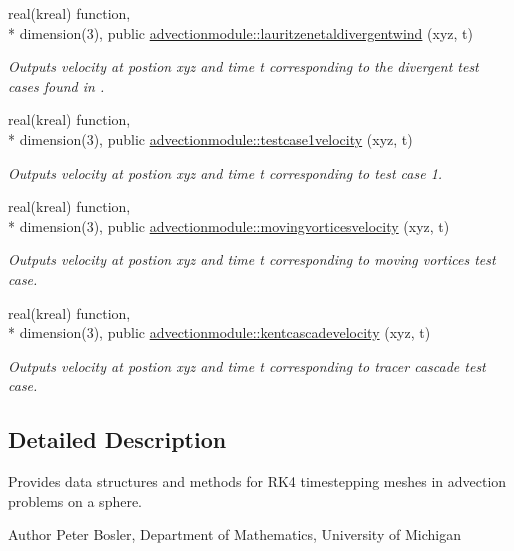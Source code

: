 \begin{DoxyCompactItemize}
real(kreal) function, \\*
dimension(3), public \hyperlink{group__AdvectionRK4_ga8f7661486a24b73e0ccff377adfb29db}{advectionmodule\+::lauritzenetaldivergentwind} (xyz, t)
\begin{DoxyCompactList}\small\item\em Outputs velocity at postion xyz and time t corresponding to the divergent test cases found in \cite{LauritzenEtAl2012}. \end{DoxyCompactList}\item 
real(kreal) function, \\*
dimension(3), public \hyperlink{group__AdvectionRK4_gad30efb36915276cdc54a055b474d93d8}{advectionmodule\+::testcase1velocity} (xyz, t)
\begin{DoxyCompactList}\small\item\em Outputs velocity at postion xyz and time t corresponding to \cite{WilliamsonEtAl1992} test case 1. \end{DoxyCompactList}\item 
real(kreal) function, \\*
dimension(3), public \hyperlink{group__AdvectionRK4_gaad6c3850042d085e15518e2cb9d8909f}{advectionmodule\+::movingvorticesvelocity} (xyz, t)
\begin{DoxyCompactList}\small\item\em Outputs velocity at postion xyz and time t corresponding to \cite{NairJablonowski2008} moving vortices test case. \end{DoxyCompactList}\item 
real(kreal) function, \\*
dimension(3), public \hyperlink{group__AdvectionRK4_ga0001703c78ad97926664935bc766e15c}{advectionmodule\+::kentcascadevelocity} (xyz, t)
\begin{DoxyCompactList}\small\item\em Outputs velocity at postion xyz and time t corresponding to \cite{KentEtAl2012} tracer cascade test case. \end{DoxyCompactList}\end{DoxyCompactItemize}


\subsection{Detailed Description}
Provides data structures and methods for R\+K4 timestepping meshes in advection problems on a sphere. 

\begin{DoxyAuthor}{Author}
Peter Bosler, Department of Mathematics, University of Michigan 
\end{DoxyAuthor}


